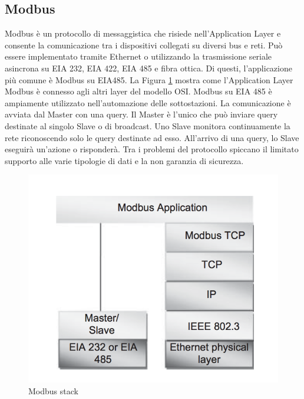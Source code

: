 \subsection{Modbus}
Modbus è un protocollo di messaggistica che risiede nell'Application Layer e consente la comunicazione tra i dispositivi collegati su diversi bus e reti. Può essere implementato tramite Ethernet o utilizzando la trasmissione seriale asincrona su EIA 232, EIA 422, EIA 485 e fibra ottica. Di questi, l'applicazione più comune è Modbus su EIA485. La Figura \ref{fig:modbus} mostra come l'Application Layer Modbus è connesso agli altri layer del modello OSI.
Modbus su EIA 485 è ampiamente utilizzato nell'automazione delle sottostazioni. La comunicazione è avviata dal Master con una query. Il Master è l'unico che può inviare query destinate al singolo Slave o di broadcast. Uno Slave monitora continuamente la rete riconoscendo solo le query destinate ad esso. All'arrivo di una query, lo Slave eseguirà un'azione o risponderà. Tra i problemi del protocollo spiccano il limitato supporto alle varie tipologie di dati e la non garanzia di sicurezza.
\begin{figure}[h]
	\centering
	\includegraphics[scale=0.500]{imgs/modbus.png}
	\caption{Modbus stack} \label{fig:modbus}
\end{figure}
\newpage
